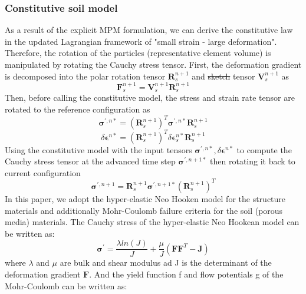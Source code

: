 \documentclass[preprint,12pt]{elsarticle}
\providecommand{\DIFadd}[1]{{\protect\color{blue}\uwave{#1}}} %
\providecommand{\DIFdel}[1]{{\protect\color{red}\sout{#1}}}                      %
\providecommand{\DIFaddbegin}{} %
\providecommand{\DIFaddend}{} %
\providecommand{\DIFdelbegin}{} %
\providecommand{\DIFdelend}{} %
\newcommand{\DIFscaledelfig}{0.5}
\newlength{\DIFdelgraphicswidth} %
\newlength{\DIFdelgraphicsheight} %
\newcommand{\DIFaddincludegraphics}[2][]{{\color{blue}\fbox{\DIFOincludegraphics[#1]{#2}}}} %
\newcommand{\DIFdelincludegraphics}[2][]{%
\sbox{\DIFdelgraphicsbox}{\DIFOincludegraphics[#1]{#2}}%
\settoboxwidth{\DIFdelgraphicswidth}{\DIFdelgraphicsbox} %
\settoboxtotalheight{\DIFdelgraphicsheight}{\DIFdelgraphicsbox} %
\scalebox{\DIFscaledelfig}{%
\parbox[b]{\DIFdelgraphicswidth}{\usebox{\DIFdelgraphicsbox}\\[-\baselineskip] \rule{\DIFdelgraphicswidth}{0em}}\llap{\resizebox{\DIFdelgraphicswidth}{\DIFdelgraphicsheight}{%
\setlength{\unitlength}{\DIFdelgraphicswidth}%
\begin{picture}(1,1)%
\thicklines\linethickness{2pt} %
{\color[rgb]{1,0,0}\put(0,0){\framebox(1,1){}}}%
{\color[rgb]{1,0,0}\put(0,0){\line( 1,1){1}}}%
{\color[rgb]{1,0,0}\put(0,1){\line(1,-1){1}}}%
\end{picture}%
}\hspace*{3pt}}} %
} %
\DeclareRobustCommand{\DIFaddbegin}{\DIFOaddbegin \let\includegraphics\DIFaddincludegraphics} %
\DeclareRobustCommand{\DIFaddend}{\DIFOaddend \let\includegraphics\DIFOincludegraphics} %
\DeclareRobustCommand{\DIFdelbegin}{\DIFOdelbegin \let\includegraphics\DIFdelincludegraphics} %
\DeclareRobustCommand{\DIFdelend}{\DIFOaddend \let\includegraphics\DIFOincludegraphics} %
\begin{document}
\subsubsection{Constitutive soil model}
As a result of the explicit MPM formulation, we can derive the constitutive law in the updated Lagrangian framework of "small strain - large deformation". Therefore, the rotation of the particles (representative element volume) is manipulated by rotating the Cauchy stress tensor. First, the deformation gradient is decomposed into the polar rotation tensor $\pmb{R}_s^{n+1}$ and \DIFdelbegin \DIFdel{sketch }\DIFdelend \DIFaddbegin \DIFadd{stretch }\DIFaddend tensor $\pmb{V}_s^{n+1}$ as\DIFaddbegin \DIFadd{:
}\DIFaddend %
%
\begin{equation}
     \pmb{F}_s^{n+1} = \pmb{V}_s^{n+1} \pmb{R}_s^{n+1}
\end {equation}
%
%
Then, before calling the constitutive model, the stress and strain rate tensor are rotated to the reference configuration as\DIFaddbegin \DIFadd{:
}\DIFaddend %
%
\begin{equation}
     \pmb{\sigma}^{\prime,n*} =  (\pmb{R}_s^{n+1})^T \pmb{\sigma}^{\prime,n*} \pmb{R}_s^{n+1}
\end {equation}
%
%
\begin{equation}
    \delta \pmb{\epsilon}^{n*} =  (\pmb{R}_s^{n+1})^T \delta \pmb{\epsilon}_s^{n*} \pmb{R}_s^{n+1}
\end {equation}
%
%
Using the constitutive model with the input tensors $\pmb{\sigma}^{\prime,n*}, \delta \pmb{\epsilon}^{n*}$ to compute the Cauchy stress tensor at the advanced time step $\pmb{\sigma}^{\prime,n+1*}$ then rotating it back to current configuration \DIFaddbegin \DIFadd{as:
}\DIFaddend %
%
\begin{equation}
    \pmb{\sigma}^{\prime,n+1} =  \pmb{R}_s^{n+1} \pmb{\sigma}^{\prime,n+1*} (\pmb{R}_s^{n+1})^T
\end {equation}
%
%
In this paper, we adopt the hyper-elastic Neo Hooken model for the structure materials and additionally Mohr-Coulomb failure criteria for the soil (porous media) materials. The Cauchy stress of the hyper-elastic Neo Hookean model can be written as:
%
%
\begin{equation}
    \pmb{\sigma}^{\prime} =  \frac{ \lambda ln(J)}{J} + \frac{\mu}{J} (\pmb{F} \pmb{F}^T - \pmb{J})
\end {equation}
%
%
where $\lambda$ and $\mu$ are bulk and shear modulus ad J is the determinant of the deformation gradient $\pmb{F}$. And the yield function f and flow potentials g of the Mohr-Coulomb can be written as:
\end{document}
